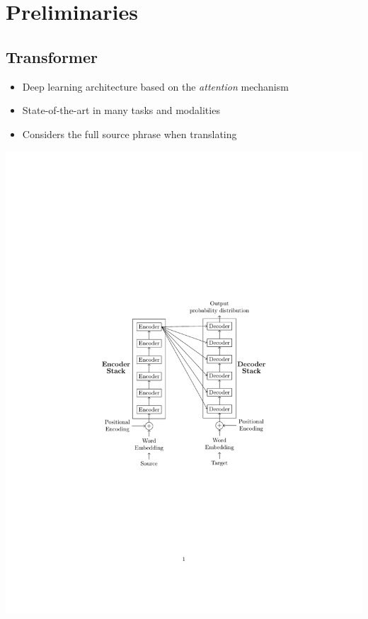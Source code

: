 \documentclass[landscape]{article}
\begin{document}

\cp
\section*{Preliminaries}
\vspace*{10mm}
\subsection*{Transformer}
\vspace*{-12mm}
\begin{itemize}\itemsep=7mm
	\item Deep learning architecture based on the \textit{attention} mechanism
	\item State-of-the-art in many tasks and modalities
	\item Considers the full source phrase when translating
\end{itemize}
\endminipage\hfill
{}
\vspace{14mm}
\centering
\includegraphics[trim=5.8cm 8.5cm 5.8cm 9cm, scale=1.4, clip]{figures/transformer}
\endminipage\hfill
\end{document}
